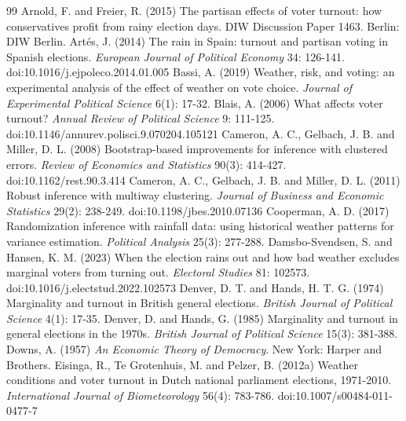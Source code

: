 \documentclass[11pt,a4paper]{article}
\begin{document}
\begin{thebibliography}{99}
 Arnold, F. and Freier, R. (2015) The partisan effects of voter turnout: how conservatives profit from rainy election days. DIW Discussion Paper 1463. Berlin: DIW Berlin.
 Art\'es, J. (2014) The rain in Spain: turnout and partisan voting in Spanish elections. \textit{European Journal of Political Economy} 34: 126-141. doi:10.1016/j.ejpoleco.2014.01.005
 Bassi, A. (2019) Weather, risk, and voting: an experimental analysis of the effect of weather on vote choice. \textit{Journal of Experimental Political Science} 6(1): 17-32.
 Blais, A. (2006) What affects voter turnout? \textit{Annual Review of Political Science} 9: 111-125. doi:10.1146/annurev.polisci.9.070204.105121
 Cameron, A. C., Gelbach, J. B. and Miller, D. L. (2008) Bootstrap-based improvements for inference with clustered errors. \textit{Review of Economics and Statistics} 90(3): 414-427. doi:10.1162/rest.90.3.414
 Cameron, A. C., Gelbach, J. B. and Miller, D. L. (2011) Robust inference with multiway clustering. \textit{Journal of Business and Economic Statistics} 29(2): 238-249. doi:10.1198/jbes.2010.07136
 Cooperman, A. D. (2017) Randomization inference with rainfall data: using historical weather patterns for variance estimation. \textit{Political Analysis} 25(3): 277-288.
 Damsbo-Svendsen, S. and Hansen, K. M. (2023) When the election rains out and how bad weather excludes marginal voters from turning out. \textit{Electoral Studies} 81: 102573. doi:10.1016/j.electstud.2022.102573
 Denver, D. T. and Hands, H. T. G. (1974) Marginality and turnout in British general elections. \textit{British Journal of Political Science} 4(1): 17-35.
 Denver, D. and Hands, G. (1985) Marginality and turnout in general elections in the 1970s. \textit{British Journal of Political Science} 15(3): 381-388.
 Downs, A. (1957) \textit{An Economic Theory of Democracy}. New York: Harper and Brothers.
 Eisinga, R., Te Grotenhuis, M. and Pelzer, B. (2012a) Weather conditions and voter turnout in Dutch national parliament elections, 1971-2010. \textit{International Journal of Biometeorology} 56(4): 783-786. doi:10.1007/s00484-011-0477-7

\end{thebibliography}
\end{document}
